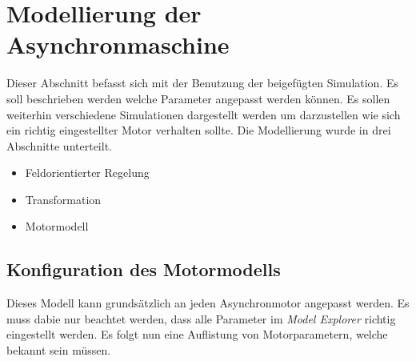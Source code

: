 \section{Modellierung der Asynchronmaschine}
Dieser Abschnitt befasst sich mit der Benutzung der beigefügten Simulation. Es soll beschrieben werden welche Parameter angepasst werden können. Es sollen weiterhin verschiedene Simulationen dargestellt werden um darzustellen wie sich ein richtig eingestellter Motor verhalten sollte.
Die Modellierung wurde in drei Abschnitte unterteilt.
\begin{itemize}
	\item Feldorientierter Regelung
	\item Transformation
	\item Motormodell
\end{itemize}
\subsection{Konfiguration des Motormodells}
Dieses Modell kann grundsätzlich an jeden Asynchronmotor angepasst werden. Es muss dabie nur beachtet werden, dass alle Parameter im \textit{Model Explorer} richtig eingestellt werden.
Es folgt nun eine Auflistung von Motorparametern, welche bekannt sein müssen.\\\par

